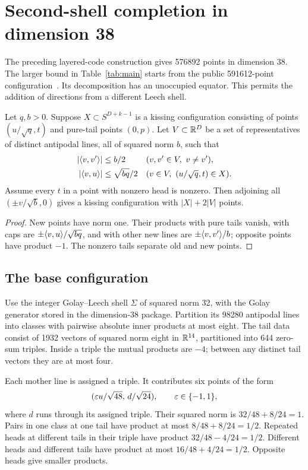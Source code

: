 \section{Second-shell completion in dimension 38}\label{sec:completion}
The preceding layered-code construction gives 576892 points in
dimension 38. The larger bound in Table~\ref{tab:main} starts from
the public 591612-point configuration~\cite{kissingnumbers}. Its
decomposition has an unoccupied equator. This permits the addition
of directions from a different Leech shell.

\begin{lemma}\label{lem:completion}
Let $q,b>0$. Suppose $X\subset S^{D+k-1}$ is a kissing configuration consisting
of points $(u/\sqrt q,t)$ and pure-tail points $(0,p)$.
Let $V\subset\mathbb R^D$ be a set of representatives of distinct
antipodal lines, all of squared norm $b$, such that
\begin{align}
 |\langle v,v'\rangle|&\le b/2&&
       (v,v'\in V,\ v\ne v'),\label{eq:completion-new}\\
 |\langle v,u\rangle|&\le\sqrt{bq}/2&&
       (v\in V,\ (u/\sqrt q,t)\in X).\label{eq:completion-old}
\end{align}
Assume every $t$ in a point with nonzero head is nonzero.
Then adjoining all $(\pm v/\sqrt b,0)$ gives a kissing configuration
with $|X|+2|V|$ points.
\end{lemma}
\begin{proof}
New points have norm one. Their products with pure tails vanish,
with caps are $\pm\langle v,u\rangle/\sqrt{bq}$, and with other new lines
are $\pm\langle v,v'\rangle/b$; opposite points have product $-1$.
The nonzero tails separate old and new points.
\end{proof}

\subsection{The base configuration}
Use the integer Golay--Leech shell $\Sigma$ of squared norm 32,
with the Golay generator stored in the dimension-38 package.
Partition its 98280 antipodal lines into classes with pairwise
absolute inner products at most eight. The tail data consist of
1932 vectors of squared norm eight in $\mathbb R^{14}$, partitioned into
644 zero-sum triples. Inside a triple the mutual products are $-4$;
between any distinct tail vectors they are at most four.

Each mother line is assigned a triple. It contributes six points
of the form
\begin{equation}\label{eq:d38-base-caps}
 (\varepsilon u/\sqrt{48},\,d/\sqrt{24}),
 \qquad \varepsilon\in\{-1,1\},
\end{equation}
where $d$ runs through its assigned triple.
Their squared norm is $32/48+8/24=1$. Pairs in one class at one
tail have product at most $8/48+8/24=1/2$. Repeated heads
at different tails in their triple have product
$32/48-4/24=1/2$. Different heads and different tails have product
at most $16/48+4/24=1/2$.
Opposite heads give smaller products.

